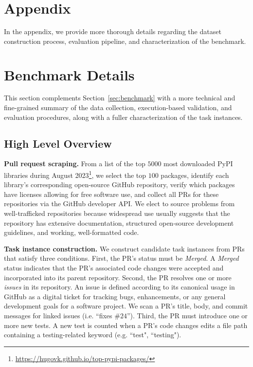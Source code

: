 \section*{Appendix}
\label{appx:intro}
In the appendix, we provide more thorough details regarding the dataset construction process, evaluation pipeline, and characterization of the \benchmark{} benchmark.

\section{Benchmark Details}
\label{appx:benchmark}

This section complements Section~\ref{sec:benchmark} with a more technical and fine-grained summary of the data collection, execution-based validation, and evaluation procedures, along with a fuller characterization of the task instances.

\subsection{High Level Overview}

\textbf{Pull request scraping.} From a list of the top $\num{5000}$ most downloaded PyPI libraries during August 2023\footnote{\href{https://hugovk.github.io/top-pypi-packages/}{https://hugovk.github.io/top-pypi-packages/}}, we select the top $100$ packages, identify each library's corresponding open-source GitHub repository, verify which packages have licenses allowing for free software use, and collect all PRs for these repositories via the GitHub developer API.
We elect to source problems from well-trafficked repositories because widespread use usually suggests that the repository has extensive documentation, structured open-source development guidelines, and working, well-formatted code.

\textbf{Task instance construction.} We construct candidate task instances from PRs that satisfy three conditions.
First, the PR's status must be \textit{Merged}.
A \textit{Merged} status indicates that the PR's associated code changes were accepted and incorporated into its parent repository. 
Second, the PR resolves one or more \textit{issues} in its repository.
An issue is defined according to its canonical usage in GitHub as a digital ticket for tracking bugs, enhancements, or any general development goals for a software project.
We scan a PR's title, body, and commit messages for linked issues (i.e. ``fixes \#$24$'').
Third, the PR must introduce one or more new tests.
A new test is counted when a PR's code changes edits a file path containing a testing-related keyword (e.g. ``test", ``testing").

